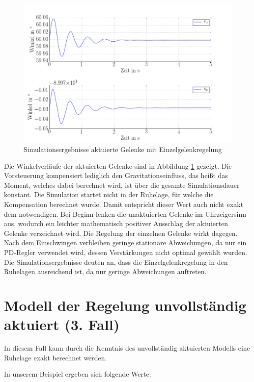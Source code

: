 \begin{figure}[h]
\centering
\includegraphics[width=1\linewidth]{RuhelageGelenkQ1Q2.png}
\caption{Simulationsergebnisse aktuierte Gelenke mit Einzelgelenkregelung}
\label{fig:RuhelageGelenkQ1Q2}
\end{figure}

Die Winkelverläufe der aktuierten Gelenke sind in Abbildung \ref{fig:RuhelageGelenkQ1Q2} gezeigt. Die Vorsteuerung kompensiert lediglich den Gravitationseinfluss, das heißt das Moment, welches dabei berechnet wird, ist über die gesamte Simulationsdauer konstant. Die Simulation startet nicht in der Ruhelage, für welche die Kompensation berechnet wurde. Damit entspricht dieser Wert auch nicht exakt dem notwendigen. Bei Beginn lenken die unaktuierten Gelenke im Uhrzeigersinn aus, wodurch ein leichter mathematisch positiver Ausschlag der aktuierten Gelenke verzeichnet wird. Die Regelung der einzelnen Gelenke wirkt dagegen. Nach dem Einschwingen verbleiben geringe stationäre Abweichungen, da nur ein PD-Regler verwendet wird, dessen Verstärkungen nicht optimal gewählt wurden. Die Simulationsergebnisse deuten an, dass die Einzelgelenkregelung in den Ruhelagen ausreichend ist, da nur geringe Abweichungen auftreten.
 
\section{Modell der Regelung unvollständig aktuiert (3. Fall)}

In diesem Fall kann durch die Kenntnis des unvollständig aktuierten Modells eine Ruhelage exakt berechnet werden. 

In unserem Beispiel ergeben sich folgende Werte:


